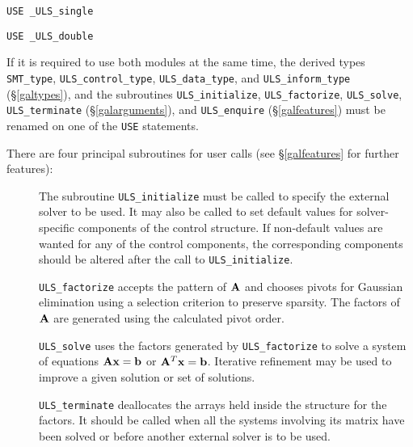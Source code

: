 \documentclass{galahad}
\newcommand{\packagename}{ULS}
\newcommand{\fullpackagename}{\libraryname\_\-\packagename}
\begin{document}
\medskip{}

\hskip0.5in {\tt USE \fullpackagename\_single}

\medskip{}

\hskip0.5in {\tt USE  \fullpackagename\_double}

\medskip

If it is required to use both modules at the same time, the derived types
{\tt SMT\_type},
{\tt \packagename\_control\_type},
{\tt \packagename\_data\-\_type}, and
{\tt \packagename\_inform\_type}
(\S\ref{galtypes}),
and the subroutines
{\tt \packagename\_initialize},
{\tt \packagename\_factorize},
{\tt \packagename\_solve},
{\tt \packagename\_terminate}
(\S\ref{galarguments}),
and
{\tt \packagename\_enquire}
(\S\ref{galfeatures})
must be renamed on one of the {\tt USE} statements.

\noindent There are four principal subroutines for user calls (see
\S\ref{galfeatures} for further features):

\begin{description}

\item[] The subroutine {\tt \packagename\_initialize} must be called to
specify the external solver to be used.
It may also be called to set default values
for solver-specific components of the control structure.
If non-default values are
wanted for any of the control components, the corresponding components
should be altered after the call to {\tt \packagename\_initialize}.

\item[] {\tt \packagename\_factorize} accepts the pattern of ${\mathbf{A}}$
 and chooses pivots for Gaussian elimination using a selection
 criterion to preserve sparsity.  The factors of ${\mathbf{A}}$ are generated
 using the calculated pivot order.

\item[] {\tt \packagename\_solve} uses the factors generated by
  {\tt \packagename\_factorize} to solve a system of equations
  ${\mathbf{A}} {\mathbf{x}} = {\mathbf{b}}$ or ${\mathbf{A}}^T {\mathbf{x}} = {\mathbf{b}}$.
  Iterative refinement may be used to improve a given solution
  or set of solutions.

\item[] {\tt \packagename\_terminate} deallocates the arrays held inside the
  structure for the factors. It should be called
  when all the systems involving its matrix have been solved
  or before another external solver is to be used.
\end{description}
\end{document}
